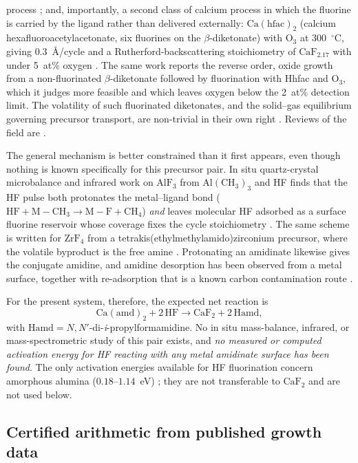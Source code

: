 \documentclass[11pt,a4paper]{article}
\theoremstyle{plain}
\theoremstyle{definition}
\theoremstyle{remark}
\begin{document}
\begin{itemize}
process \citep{Ylilammi1994}; and, importantly, a second class of calcium
process in which the fluorine is carried by the ligand rather than delivered
externally: $\mathrm{Ca(hfac)_2}$ (calcium hexafluoroacetylacetonate, six
fluorines on the $\beta$-diketonate) with $\mathrm{O_3}$ at 300~$^\circ$C,
giving $0.3$~\AA/cycle and a Rutherford-backscattering stoichiometry of
$\mathrm{CaF_{2.17}}$ with under 5~at\% oxygen \citep{Putkonen2011}. The same
work reports the reverse order, oxide growth from a non-fluorinated
$\beta$-diketonate followed by fluorination with Hhfac and $\mathrm{O_3}$,
which it judges more feasible and which leaves oxygen below the 2~at\%
detection limit. The volatility of such fluorinated diketonates, and the
solid--gas equilibrium governing precursor transport, are non-trivial in their
own right \citep{LoPresti2022}. Reviews of the field are
\citep{Atosuo2024,Hennessy2017}.
\end{itemize}

The general mechanism is better constrained than it first appears, even though
nothing is known specifically for this precursor pair. In situ quartz-crystal
microbalance and infrared work on $\mathrm{AlF_3}$ from $\mathrm{Al(CH_3)_3}$ and
HF finds that the HF pulse both protonates the metal--ligand bond
($\mathrm{HF}+\mathrm{M{-}CH_3}\to\mathrm{M{-}F}+\mathrm{CH_4}$) \emph{and}
leaves molecular HF adsorbed as a surface fluorine reservoir whose coverage
fixes the cycle stoichiometry \citep{Lee2015}. The same scheme is written for
$\mathrm{ZrF_4}$ from a tetrakis(ethylmethylamido)zirconium precursor, where the
volatile byproduct is the free amine \citep{Lee2016}. Protonating an amidinate
likewise gives the conjugate amidine, and amidine desorption has been observed
from a metal surface, together with re-adsorption that is a known carbon
contamination route \citep{Ma2011}.

For the present system, therefore, the expected net reaction is
\[
\mathrm{Ca(amd)_2} + 2\,\mathrm{HF}
  \longrightarrow \mathrm{CaF_2} + 2\,\mathrm{Hamd},
\]
with $\mathrm{Hamd} = N,N'$-di-\emph{i}-propylformamidine. No in situ
mass-balance, infrared, or mass-spectrometric study of this pair exists, and
\emph{no measured or computed activation energy for HF reacting with any metal
amidinate surface has been found}. The only activation energies available for
HF fluorination concern amorphous alumina
($0.18$--$1.14$~eV) \citep{Khumaini2025}; they are not transferable to
$\mathrm{CaF_2}$ and are not used below.

\subsection{Certified arithmetic from published growth data}
\end{document}
